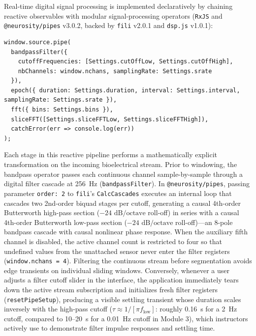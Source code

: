 \documentclass[11pt,letterpaper]{article}
\begin{document}
Real-time digital signal processing is implemented declaratively by chaining reactive observables with modular signal-processing operators (\texttt{RxJS} and \texttt{@neurosity/pipes} v3.0.2, backed by \texttt{fili} v2.0.1 and \texttt{dsp.js} v1.0.1):
\begin{lstlisting}
window.source.pipe(
  bandpassFilter({
    cutoffFrequencies: [Settings.cutOffLow, Settings.cutOffHigh],
    nbChannels: window.nchans, samplingRate: Settings.srate
  }),
  epoch({ duration: Settings.duration, interval: Settings.interval, samplingRate: Settings.srate }),
  fft({ bins: Settings.bins }),
  sliceFFT([Settings.sliceFFTLow, Settings.sliceFFTHigh]),
  catchError(err => console.log(err))
);
\end{lstlisting}
Each stage in this reactive pipeline performs a mathematically explicit transformation on the incoming bioelectrical stream. Prior to windowing, the bandpass operator passes each continuous channel sample-by-sample through a digital filter cascade at 256~Hz (\texttt{bandpassFilter}). In \texttt{@neurosity/pipes}, passing parameter \texttt{order: 2} to \texttt{fili}'s \texttt{CalcCascades} executes an internal loop that cascades two 2nd-order biquad stages per cutoff, generating a causal 4th-order Butterworth high-pass section ($-24\text{ dB/octave}$ roll-off) in series with a causal 4th-order Butterworth low-pass section ($-24\text{ dB/octave}$ roll-off)---an 8-pole bandpass cascade with causal nonlinear phase response. When the auxiliary fifth channel is disabled, the active channel count is restricted to four so that undefined values from the unattached sensor never enter the filter registers (\texttt{window.nchans = 4}). Filtering the continuous stream before segmentation avoids edge transients on individual sliding windows. Conversely, whenever a user adjusts a filter cutoff slider in the interface, the application immediately tears down the active stream subscription and initializes fresh filter registers (\texttt{resetPipeSetup}), producing a visible settling transient whose duration scales inversely with the high-pass cutoff ($\tau \approx 1 / [\pi f_{\text{low}}]$: roughly 0.16~s for a 2~Hz cutoff, compared to 10--20~s for a 0.01~Hz cutoff in Module 3), which instructors actively use to demonstrate filter impulse responses and settling time.
\end{document}
